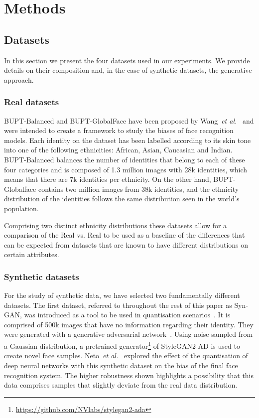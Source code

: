 \documentclass[a4paper, 10pt, conference]{ieeeconf}      %
\begin{document}
\section{Methods}

\subsection{Datasets}

In this section we present the four datasets used in our experiments. We provide details on their composition and, in the case of synthetic datasets, the generative approach. 

\subsubsection{Real datasets}

BUPT-Balanced and BUPT-GlobalFace have been proposed by Wang~\textit{et al.}~\cite{wang2021meta} and were intended to create a framework to study the biases of face recognition models. Each identity on the dataset has been labelled according to its skin tone into one of the following ethnicities: African, Asian, Caucasian and Indian. BUPT-Balanced balances the number of identities that belong to each of these four categories and is composed of 1.3 million images with 28k identities, which means that there are 7k identities per ethnicity. On the other hand, BUPT-Globalface contains two million images from 38k identities, and the ethnicity distribution of the identities follows the same distribution seen in the world's population. 

Comprising two distinct ethnicity distributions these datasets allow for a comparison of the Real vs. Real to be used as a baseline of the differences that can be expected from datasets that are known to have different distributions on certain attributes. 

\subsubsection{Synthetic datasets}

For the study of synthetic data, we have selected two fundamentally different datasets. The first dataset, referred to throughout the rest of this paper as Syn-GAN, was introduced as a tool to be used in quantisation scenarios~\cite{boutros2022quantface}. It is comprised of 500k images that have no information regarding their identity. They were generated with a generative adversarial network~\cite{goodfellow2014generative}. Using noise sampled from a Gaussian distribution, a pretrained generator\footnote{\url{https://github.com/NVlabs/stylegan2-ada}} of StyleGAN2-AD is used to create novel face samples. Neto~\textit{et al.}~\cite{neto2023compressed} explored the effect of the quantisation of deep neural networks with this synthetic dataset on the bias of the final face recognition system. The higher robustness shown highlights a possibility that this data comprises samples that slightly deviate from the real data distribution. 
\end{document}
